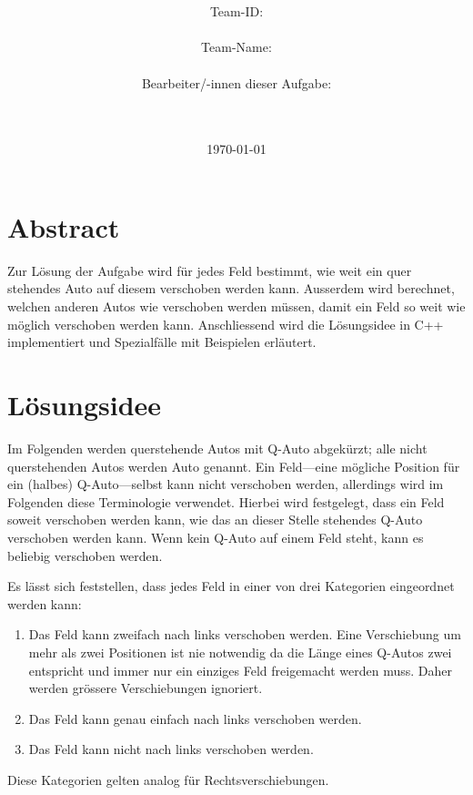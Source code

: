 \documentclass[a4paper,10pt,ngerman]{scrartcl}
\title{\textbf{\Huge\Aufgabe}}
\author{\LARGE Team-ID: \LARGE \TeamId \\\\
	    \LARGE Team-Name: \LARGE \TeamName \\\\
	    \LARGE Bearbeiter/-innen dieser Aufgabe: \\ 
	    \LARGE \Namen\\\\}
\date{\LARGE\today}
\begin{document}
\maketitle
\tableofcontents

\vspace{0.5cm}

\section{Abstract}
Zur Lösung der Aufgabe wird für jedes Feld bestimmt, wie weit ein quer stehendes Auto auf diesem verschoben werden kann.
Ausserdem wird berechnet, welchen anderen Autos wie verschoben werden müssen, damit ein Feld so weit wie möglich verschoben werden kann.
Anschliessend wird die Lösungsidee in C++ implementiert und Spezialfälle mit Beispielen erläutert.

\section{Lösungsidee}
Im Folgenden werden querstehende Autos mit \glqq{}Q-Auto\grqq{} abgekürzt; alle nicht querstehenden Autos werden \glqq{}Auto\grqq{} genannt.
Ein Feld---eine mögliche Position für ein (halbes) Q-Auto---selbst kann nicht verschoben werden, allerdings wird im Folgenden diese Terminologie verwendet.
Hierbei wird festgelegt, dass ein Feld soweit verschoben werden kann, wie das an dieser Stelle stehendes Q-Auto verschoben werden kann.
Wenn kein Q-Auto auf einem Feld steht, kann es beliebig verschoben werden.

Es lässt sich feststellen, dass jedes Feld in einer von drei Kategorien eingeordnet werden kann:
\begin{enumerate}
    \item Das Feld kann zweifach nach links verschoben werden.
          Eine Verschiebung um mehr als zwei Positionen ist nie notwendig da die Länge eines Q-Autos zwei entspricht und immer nur ein einziges Feld freigemacht werden muss.
          Daher werden grössere Verschiebungen ignoriert.
    \item Das Feld kann genau einfach nach links verschoben werden.
    \item Das Feld kann nicht nach links verschoben werden.
\end{enumerate}
Diese Kategorien gelten analog für Rechtsverschiebungen.
\end{document}
